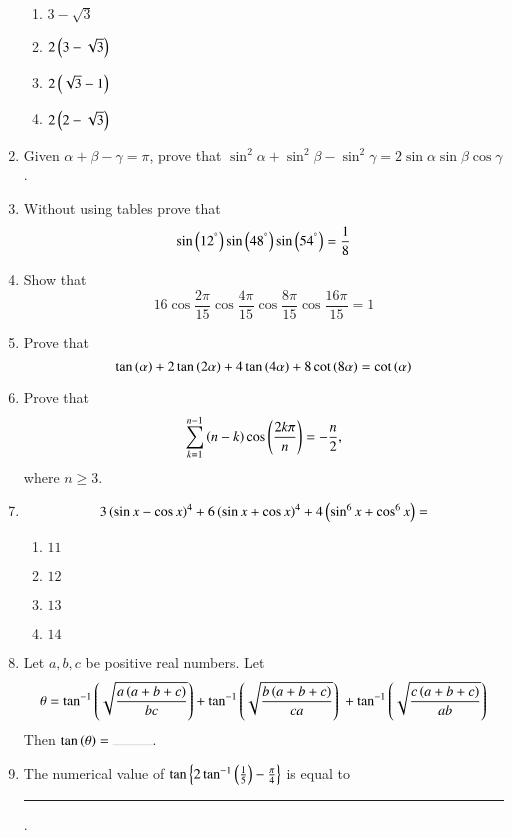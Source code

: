 \begin{enumerate}[label=\thesubsection.\arabic*,ref=\thesubsection.\theenumi]
\begin{multicols}{4}
\begin{enumerate}
\item $3-\sqrt{3}$
\item $2\left(3-\sqrt{3}\right)$
\item $2\left(\sqrt{3}-1\right)$
\item $2\left(2-\sqrt{3}\right)$
\end{enumerate}
\end{multicols}
\item Given $\alpha+\beta-\gamma=\pi$, prove that $\sin^2{\alpha}+\sin^2{\beta}-\sin^2{\gamma}=2\sin{\alpha}\sin{\beta}\cos{\gamma}$. \hfill{}
\item Without using tables prove that 
\hfill {}
$$ 
\sin\left(12^{\degree}\right)\sin\left(48^{\degree}\right)\sin\left(54^{\degree}\right)= \frac{1}{8}
$$
\item Show that 
\hfill{}
$$
16{\cos{\frac{2\pi}{15}}}{\cos{\frac{4\pi}{15}}}{\cos{\frac{8\pi}{15}}}{\cos{\frac{16\pi}{15}}}=1
$$
\item Prove that 
\hfill{}
$$
\tan \left(\alpha\right)+2\tan \left(2\alpha\right)+4\tan \left(4\alpha\right)+8\cot \left(8\alpha\right)=\cot \left(\alpha\right)
$$
\item Prove that 
\hfill{}
$$
\sum_{k=1}^{n-1} \left(n-k\right)\cos\left( \frac{2k\pi}{n}\right)=-\frac{n}{2}
,
$$
 where $n\ge3$.
	\item 
        \hfill{}
		\begin{align*}
		3\left(\sin{x} - \cos{x}\right)^4 + 6\left(\sin{x} + \cos{x}\right)^4 +  4\left(\sin^6{x}+\cos^6{x}\right) =
	\end{align*}
\begin{multicols}{4}
\begin{enumerate}
                \item $11$
                \item $12$
                \item $13$
                \item $14$
        \end{enumerate}
\end{multicols}   
%
\item Let $a,b,c$ be positive real numbers. Let
\begin{multline*}
\theta=\tan ^{-1}\left(\sqrt{\frac{a\left(a+b+c\right)}{bc}}\right) + \tan ^{-1}\left(\sqrt{\frac{b\left(a+b+c\right)}{ca}}\right)\ + \tan ^{-1}\left(\sqrt{\frac{c\left(a+b+c\right)}{ab}}\right) 
\end{multline*}
Then $\tan \brak{\theta}= \rule{1cm}{0.1pt}.$ 
\hfill {}
\item The numerical value of $\tan \left\{ 2\tan ^{-1}\left(\frac{1}{5}\right)-\frac{\pi}{4}\right\}$ is equal to \rule{1cm}{0.1pt}.

\end{enumerate}
